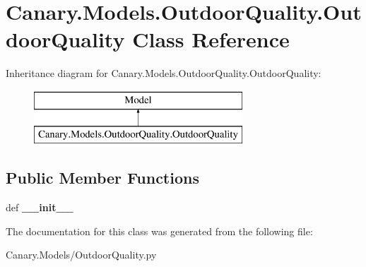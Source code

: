 \hypertarget{class_canary_8_models_1_1_outdoor_quality_1_1_outdoor_quality}{\section{Canary.\-Models.\-Outdoor\-Quality.\-Outdoor\-Quality Class Reference}
\label{class_canary_8_models_1_1_outdoor_quality_1_1_outdoor_quality}
}
Inheritance diagram for Canary.\-Models.\-Outdoor\-Quality.\-Outdoor\-Quality\-:\begin{figure}[H]
\begin{center}
\leavevmode
\includegraphics[height=2.000000cm]{class_canary_8_models_1_1_outdoor_quality_1_1_outdoor_quality}
\end{center}
\end{figure}
\subsection*{Public Member Functions}
\begin{DoxyCompactItemize}
\item 
\hypertarget{class_canary_8_models_1_1_outdoor_quality_1_1_outdoor_quality_a942a98e2d56c77f620d872db60a16ab9}{def {\bfseries \-\_\-\-\_\-init\-\_\-\-\_\-}}\label{class_canary_8_models_1_1_outdoor_quality_1_1_outdoor_quality_a942a98e2d56c77f620d872db60a16ab9}

\end{DoxyCompactItemize}


The documentation for this class was generated from the following file\-:\begin{DoxyCompactItemize}
\item 
Canary.\-Models/Outdoor\-Quality.\-py\end{DoxyCompactItemize}
